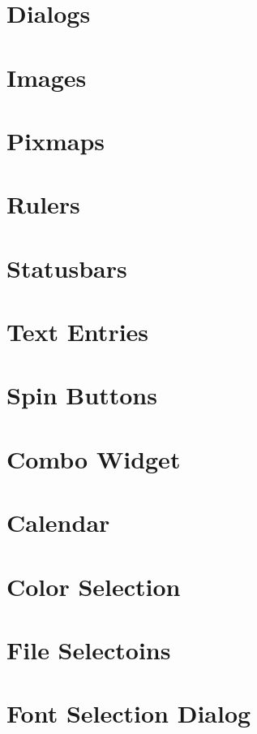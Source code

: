 \section{Dialogs}
\section{Images}
\section{Pixmaps}
\section{Rulers}
\section{Statusbars}
\section{Text Entries}
\section{Spin Buttons}
\section{Combo Widget}
\section{Calendar}
\section{Color Selection}
\section{File Selectoins}
\section{Font Selection Dialog}

